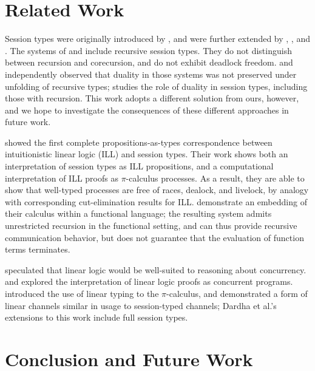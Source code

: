 \documentclass[orivec,envcountsame]{llncs}
\begin{document}
\section{Related Work}\label{sec:related}

Session types were originally introduced by \citet{Honda93}, and were further extended by
\citet{Takeuchi94}, \citet{Honda98}, and \citet{Yoshida07}. The systems of \citet{Honda98} and
\citet{Yoshida07} include recursive session types. They do not distinguish between recursion and
corecursion, and do not exhibit deadlock freedom. \citet{Bono12} and \citet{Bernardi13}
independently observed that duality in those systems was not preserved under unfolding of recursive
types; \citet{Bernardi14} studies the role of duality in session types, including those with
recursion.  This work adopts a different solution from ours, however, and we hope to investigate the
consequences of these different approaches in future work.

\citet{CairesPfenning10} showed the first complete propositions-as-types correspondence between
intuitionistic linear logic (ILL) and session types. Their work shows both an interpretation of
session types as ILL propositions, and a computational interpretation of ILL proofs as
$\pi$-calculus processes. As a result, they are able to show that well-typed processes are free of
races, dealock, and livelock, by analogy with corresponding cut-elimination results for
ILL. \citet{Toninho13} demonstrate an embedding of their calculus within a functional language; the
resulting system admits unrestricted recursion in the functional setting, and can thus provide
recursive communication behavior, but does not guarantee that the evaluation of function terms
terminates.

\citet{Girard87} speculated that linear logic would be well-suited to reasoning about concurrency.
\citet{Abramsky92} and \citet{BellinScott94} explored the interpretation of linear logic proofs as
concurrent programs. \citet{Kobayashi96} introduced the use of linear typing to the $\pi$-calculus,
and demonstrated a form of linear channels similar in usage to session-typed channels; Dardha et
al.'s~\citeyearpar{Dardha12} extensions to this work include full session types.

\section{Conclusion and Future Work}\label{sec:future}
\end{document}
